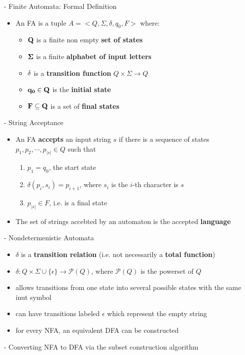 \documentclass[11pt]{article}
\newenvironment{itemise}{
\begin{itemize}
  \setlength{\itemsep}{1pt}
  \setlength{\parskip}{0pt}
  \setlength{\parsep}{0pt}
}{\end{itemize}}
\begin{document}
- Finite Automata: Formal Definition
\begin{itemise}
 \item An FA is a tuple $A=<Q, \Sigma , \delta , q_0 , F>$ where:
  \begin{itemise}
   \item ${\bf Q}$ is a finite non empty {\bf set of states}
   \item ${\bf \Sigma}$ is a finite {\bf alphabet of input letters}
   \item ${\bf \delta}$ is a {\bf transition function} $Q \times \Sigma \rightarrow Q $
   \item ${\bf q_0 \in Q}$ is the {\bf initial state}
   \item ${\bf F \subseteq Q}$ is a set of {\bf final states}
  \end{itemise}
\end{itemise}
- String Acceptance
\begin{itemise}
 \item An FA {\bf accepts} an input string $s$ if there is a sequence of states $p_1 , p_2 , \dotsi , p_{|s|} \in Q$ such that
  \begin{enumerate}
   \item $p_1 = q_0$, the start state
   \item $\delta(p_i , s_i ) = p_{i+1}$, where $s_i$ is the $i$-th character is $s$
   \item $p_{|s|} \in F$, i.e. is a final state
  \end{enumerate}
 \item The set of strings accebted by an automaton is the accepted {\bf language}
\end{itemise}
- Nondetermenistic Automata
\begin{itemise}
 \item $\delta$ is a {\bf transition relation} (i.e. not necessarily a {\bf total function})
 \item $\delta : Q \times \Sigma \cup \{ \epsilon \} \rightarrow \mathcal{P}(Q)$, where $\mathcal{P}(Q)$ is the powerset of $Q$
 \item allows transitions from one state into several possible states with the same inut symbol
 \item can have transitions labeled $\epsilon$ which represent the empty string
 \item for every NFA, an equivalent DFA can be constructed
\end{itemise}
- Converting NFA to DFA via the subset construction algorithm
\end{document}

